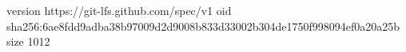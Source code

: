 version https://git-lfs.github.com/spec/v1
oid sha256:6ae8fdd9adba38b97009d2d9008b833d33002b304de1750f998094ef0a20a25b
size 1012
